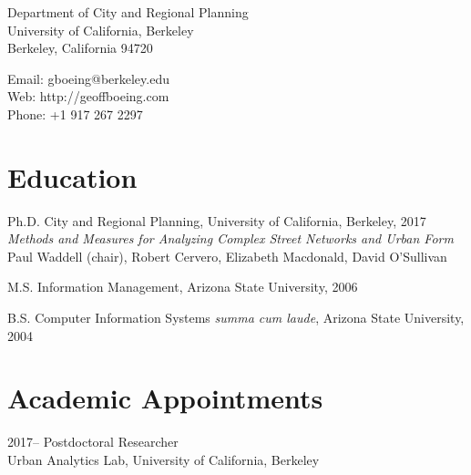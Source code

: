 \documentclass{academiccv}
\begin{document}
\raggedright

\namefont{\myname}

\vspace{1em}
\begin{minipage}[t]{0.495\textwidth}
  Department of City and Regional Planning \\
  University of California, Berkeley \\
  Berkeley, California 94720
\end{minipage}
\begin{minipage}[t]{0.495\textwidth}
  Email: gboeing@berkeley.edu \\
  Web: http://geoffboeing.com \\
  Phone: +1 917 267 2297
\end{minipage}
\vspace{0.5em}



\section*{Education}

\begin{tablist}
	
\item[Ph.D.] \tab City and Regional Planning, University of California, Berkeley, 2017 \\
                  \emph{Methods and Measures for Analyzing Complex Street Networks and Urban Form} \\
                  Paul Waddell (chair), Robert Cervero, Elizabeth Macdonald, David O'Sullivan
                  
\item[M.S.]  \tab Information Management, Arizona State University, 2006

\item[B.S.]  \tab Computer Information Systems \emph{summa cum laude}, Arizona State University, 2004

\end{tablist}



\section*{Academic Appointments}
\begin{tablist}
	
	\item[2017--] \tab Postdoctoral Researcher \\
	Urban Analytics Lab, University of California, Berkeley
	
\end{tablist}
\end{document}
